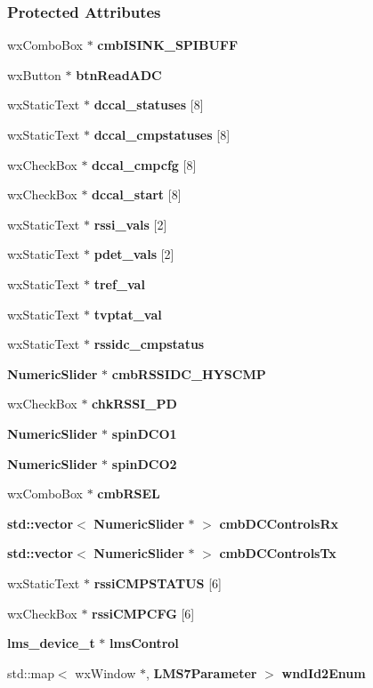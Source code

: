 \subsubsection*{Protected Attributes}
\begin{DoxyCompactItemize}
\item 
wx\+Combo\+Box $\ast$ {\bf cmb\+I\+S\+I\+N\+K\+\_\+\+S\+P\+I\+B\+U\+FF}
\item 
wx\+Button $\ast$ {\bf btn\+Read\+A\+DC}
\item 
wx\+Static\+Text $\ast$ {\bf dccal\+\_\+statuses} [8]
\item 
wx\+Static\+Text $\ast$ {\bf dccal\+\_\+cmpstatuses} [8]
\item 
wx\+Check\+Box $\ast$ {\bf dccal\+\_\+cmpcfg} [8]
\item 
wx\+Check\+Box $\ast$ {\bf dccal\+\_\+start} [8]
\item 
wx\+Static\+Text $\ast$ {\bf rssi\+\_\+vals} [2]
\item 
wx\+Static\+Text $\ast$ {\bf pdet\+\_\+vals} [2]
\item 
wx\+Static\+Text $\ast$ {\bf tref\+\_\+val}
\item 
wx\+Static\+Text $\ast$ {\bf tvptat\+\_\+val}
\item 
wx\+Static\+Text $\ast$ {\bf rssidc\+\_\+cmpstatus}
\item 
{\bf Numeric\+Slider} $\ast$ {\bf cmb\+R\+S\+S\+I\+D\+C\+\_\+\+H\+Y\+S\+C\+MP}
\item 
wx\+Check\+Box $\ast$ {\bf chk\+R\+S\+S\+I\+\_\+\+PD}
\item 
{\bf Numeric\+Slider} $\ast$ {\bf spin\+D\+C\+O1}
\item 
{\bf Numeric\+Slider} $\ast$ {\bf spin\+D\+C\+O2}
\item 
wx\+Combo\+Box $\ast$ {\bf cmb\+R\+S\+EL}
\item 
{\bf std\+::vector}$<$ {\bf Numeric\+Slider} $\ast$ $>$ {\bf cmb\+D\+C\+Controls\+Rx}
\item 
{\bf std\+::vector}$<$ {\bf Numeric\+Slider} $\ast$ $>$ {\bf cmb\+D\+C\+Controls\+Tx}
\item 
wx\+Static\+Text $\ast$ {\bf rssi\+C\+M\+P\+S\+T\+A\+T\+US} [6]
\item 
wx\+Check\+Box $\ast$ {\bf rssi\+C\+M\+P\+C\+FG} [6]
\item 
{\bf lms\+\_\+device\+\_\+t} $\ast$ {\bf lms\+Control}
\item 
std\+::map$<$ wx\+Window $\ast$, {\bf L\+M\+S7\+Parameter} $>$ {\bf wnd\+Id2\+Enum}
\end{DoxyCompactItemize}


